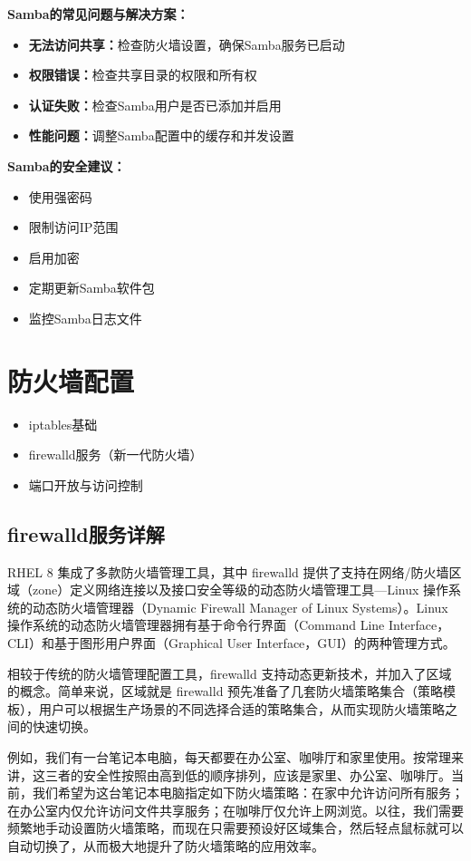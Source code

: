 \documentclass[12pt,UTF8]{ctexbook}
\begin{document}
\textbf{Samba的常见问题与解决方案：}
\begin{itemize}
    \item \textbf{无法访问共享：}检查防火墙设置，确保Samba服务已启动
    \item \textbf{权限错误：}检查共享目录的权限和所有权
    \item \textbf{认证失败：}检查Samba用户是否已添加并启用
    \item \textbf{性能问题：}调整Samba配置中的缓存和并发设置
\end{itemize}

\textbf{Samba的安全建议：}
\begin{itemize}
    \item 使用强密码
    \item 限制访问IP范围
    \item 启用加密
    \item 定期更新Samba软件包
    \item 监控Samba日志文件
\end{itemize}

\section{防火墙配置}
\begin{itemize}
    \item iptables基础
    \item firewalld服务（新一代防火墙）
    \item 端口开放与访问控制
\end{itemize}

\subsection{firewalld服务详解}
RHEL 8 集成了多款防火墙管理工具，其中 firewalld 提供了支持在网络/防火墙区域（zone）定义网络连接以及接口安全等级的动态防火墙管理工具—Linux 操作系统的动态防火墙管理器（Dynamic Firewall Manager of Linux Systems）。Linux 操作系统的动态防火墙管理器拥有基于命令行界面（Command Line Interface，CLI）和基于图形用户界面（Graphical User Interface，GUI）的两种管理方式。

相较于传统的防火墙管理配置工具，firewalld 支持动态更新技术，并加入了区域的概念。简单来说，区域就是 firewalld 预先准备了几套防火墙策略集合（策略模板），用户可以根据生产场景的不同选择合适的策略集合，从而实现防火墙策略之间的快速切换。

例如，我们有一台笔记本电脑，每天都要在办公室、咖啡厅和家里使用。按常理来讲，这三者的安全性按照由高到低的顺序排列，应该是家里、办公室、咖啡厅。当前，我们希望为这台笔记本电脑指定如下防火墙策略：在家中允许访问所有服务；在办公室内仅允许访问文件共享服务；在咖啡厅仅允许上网浏览。以往，我们需要频繁地手动设置防火墙策略，而现在只需要预设好区域集合，然后轻点鼠标就可以自动切换了，从而极大地提升了防火墙策略的应用效率。
\end{document}
